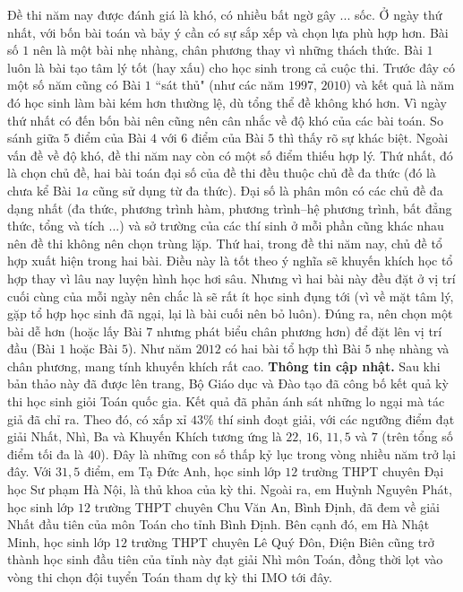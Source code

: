 \begin{multicols}{2}
	\vskip 0.1cm
	Đề thi năm nay được đánh giá là khó, có nhiều bất ngờ gây ... sốc. Ở ngày thứ nhất, với bốn bài toán và bảy ý cần có sự sắp xếp và chọn lựa phù hợp hơn. Bài số $1$ nên là một bài nhẹ nhàng, chân phương thay vì những thách thức. Bài $1$ luôn là bài tạo tâm lý tốt (hay xấu) cho học sinh trong cả cuộc thi. Trước đây có một số năm cũng có Bài $1$ ``sát thủ" (như các năm $1997$, $2010$) và kết quả là năm đó học sinh làm bài kém hơn thường lệ, dù tổng thể đề không khó hơn. Vì ngày thứ nhất có đến bốn bài nên cũng nên cân nhắc về độ khó của các bài toán. So sánh giữa $5$ điểm của Bài $4$ với $6$ điểm của Bài $5$ thì thấy rõ sự khác biệt.
	\vskip 0.1cm
	Ngoài vấn đề về độ khó, đề thi năm nay còn có một số điểm thiếu hợp lý. Thứ nhất, đó là chọn chủ đề, hai bài toán đại số của đề thi đều thuộc chủ đề đa thức (đó là chưa kể Bài $1a$ cũng sử dụng từ đa thức). Đại số là phân môn có các chủ đề đa dạng nhất (đa thức, phương trình hàm, phương trình--hệ phương trình, bất đẳng thức, tổng và tích ...) và sở trường của các thí sinh ở mỗi phần cũng khác nhau nên đề thi không nên chọn trùng lặp. Thứ hai, trong đề thi năm nay, chủ đề tổ hợp xuất hiện trong hai bài. Điều này là tốt theo ý nghĩa sẽ khuyến khích học tổ hợp thay vì lâu nay luyện hình học hơi sâu. Nhưng vì hai bài này đều đặt ở vị trí cuối cùng của mỗi ngày nên chắc là sẽ rất ít học sinh đụng tới (vì về mặt tâm lý, gặp tổ hợp học sinh đã ngại, lại là bài cuối nên bỏ luôn). Đúng ra, nên chọn một bài dễ hơn (hoặc lấy Bài $7$ nhưng phát biểu chân phương hơn) để đặt lên vị trí đầu (Bài $1$ hoặc Bài $5$). Như năm $2012$ có hai bài tổ hợp thì Bài $5$ nhẹ nhàng và chân phương, mang tính khuyến khích rất cao.
	\vskip 0.1cm
	{\bf\color{cackithi} Thông tin cập nhật.} Sau khi bản thảo này đã được lên trang, Bộ Giáo dục và Đào tạo đã công bố kết quả kỳ thi học sinh giỏi Toán quốc gia. Kết quả đã phản ánh sát những lo ngại mà tác giả đã chỉ ra. Theo đó, có xấp xỉ $43 \%$ thí sinh đoạt giải, với các ngưỡng điểm đạt giải Nhất, Nhì, Ba và Khuyến Khích tương ứng là $22$, $16$, $11,5$ và $7$ (trên tổng số điểm tối đa là $40$). Đây là những con số thấp kỷ lục trong vòng nhiều năm trở lại đây. Với $31,5$ điểm, em Tạ Đức Anh, học sinh lớp $12$ trường THPT chuyên Đại học Sư phạm Hà Nội, là thủ khoa của kỳ thi. Ngoài ra, em Huỳnh Nguyên Phát, học sinh lớp $12$ trường THPT chuyên Chu Văn An, Bình Định, đã đem về giải Nhất đầu tiên của môn Toán cho tỉnh Bình Định. Bên cạnh đó, em Hà Nhật Minh, học sinh lớp $12$ trường THPT chuyên Lê Quý Đôn, Điện Biên cũng trở thành học sinh đầu tiên của tỉnh này đạt giải Nhì môn Toán, đồng thời lọt vào vòng thi chọn đội tuyển Toán tham dự kỳ thi IMO tới đây.

\end{multicols}
